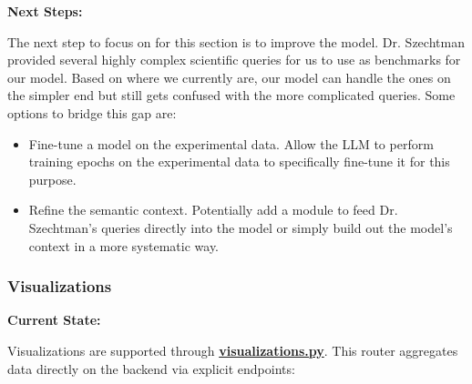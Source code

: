 \documentclass{article}
\begin{document}
\par{\textbf{Next Steps:}}
\par{The next step to focus on for this section is to improve the model. Dr. Szechtman provided several highly complex scientific queries for us to use as benchmarks for our model.
Based on where we currently are, our model can handle the ones on the simpler end but still gets confused with the more complicated queries. Some options to bridge this gap are:}
\begin{itemize}
  \item{Fine-tune a model on the experimental data. Allow the LLM to perform training epochs on the experimental data to specifically fine-tune it for this purpose.}
  \item{Refine the semantic context. Potentially add a module to feed Dr. Szechtman's queries directly into the model or simply build out the model's context in a more systematic way.}
\end{itemize}
\subsubsection{Visualizations}

\par{\textbf{Current State:}}
\par{Visualizations are supported through \href{https://github.com/OCD-Rats-Capstone/OCD-Rat-Infrastructure/blob/main/src/ocd-rat-backend/routers/visualizations.py}{\textbf{visualizations.py}}. This router aggregates data directly on the backend via explicit endpoints:}
\end{document}
